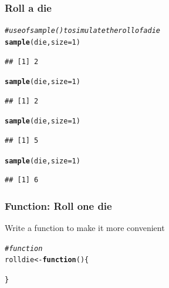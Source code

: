 \documentclass[12pt]{beamer}\usepackage[]{graphicx}\usepackage[]{color}
\makeatletter
\newcommand{\hlnum}[1]{\textcolor[rgb]{0.686,0.059,0.569}{#1}}%
\newcommand{\hlcom}[1]{\textcolor[rgb]{0.678,0.584,0.686}{\textit{#1}}}%
\newcommand{\hlstd}[1]{\textcolor[rgb]{0.345,0.345,0.345}{#1}}%
\newcommand{\hlkwa}[1]{\textcolor[rgb]{0.161,0.373,0.58}{\textbf{#1}}}%
\newcommand{\hlkwb}[1]{\textcolor[rgb]{0.69,0.353,0.396}{#1}}%
\newcommand{\hlkwc}[1]{\textcolor[rgb]{0.333,0.667,0.333}{#1}}%
\newcommand{\hlkwd}[1]{\textcolor[rgb]{0.737,0.353,0.396}{\textbf{#1}}}%
\newenvironment{kframe}{%
 \def\at@end@of@kframe{}%
 \ifinner\ifhmode%
  \def\at@end@of@kframe{\end{minipage}}%
  \begin{minipage}{\columnwidth}%
 \fi\fi%
 \def\FrameCommand##1{\hskip\@totalleftmargin \hskip-\fboxsep
 \colorbox{shadecolor}{##1}\hskip-\fboxsep
     \hskip-\linewidth \hskip-\@totalleftmargin \hskip\columnwidth}%
 \MakeFramed {\advance\hsize-\width
   \@totalleftmargin\z@ \linewidth\hsize
   \@setminipage}}%
 {\par\unskip\endMakeFramed%
 \at@end@of@kframe}
\newenvironment{knitrout}{}{} %
\makeatother
\begin{document}

\begin{frame}[fragile]
\frametitle{Roll a die}

\begin{knitrout}\footnotesize
{}\color{fgcolor}\begin{kframe}
\begin{alltt}
\hlcom{# use of sample() to simulate the roll of a die}
\hlkwd{sample}\hlstd{(die,} \hlkwc{size} \hlstd{=} \hlnum{1}\hlstd{)}
\end{alltt}
\begin{verbatim}
## [1] 2
\end{verbatim}
\end{kframe}
\end{knitrout}

\pause
\begin{knitrout}\footnotesize
{}\color{fgcolor}\begin{kframe}
\begin{alltt}
\hlkwd{sample}\hlstd{(die,} \hlkwc{size} \hlstd{=} \hlnum{1}\hlstd{)}
\end{alltt}
\begin{verbatim}
## [1] 2
\end{verbatim}
\begin{alltt}
\hlkwd{sample}\hlstd{(die,} \hlkwc{size} \hlstd{=} \hlnum{1}\hlstd{)}
\end{alltt}
\begin{verbatim}
## [1] 5
\end{verbatim}
\begin{alltt}
\hlkwd{sample}\hlstd{(die,} \hlkwc{size} \hlstd{=} \hlnum{1}\hlstd{)}
\end{alltt}
\begin{verbatim}
## [1] 6
\end{verbatim}
\end{kframe}
\end{knitrout}

\end{frame}


\begin{frame}[fragile]
\frametitle{Function: Roll one die}

Write a function to make it more convenient
\begin{knitrout}\footnotesize
{}\color{fgcolor}\begin{kframe}
\begin{alltt}
\hlcom{# function}
\hlstd{rolldie} \hlkwb{<-} \hlkwa{function}\hlstd{() \{}


\hlstd{\}}
\end{alltt}
\end{kframe}
\end{knitrout}

\end{frame}
\end{document}
